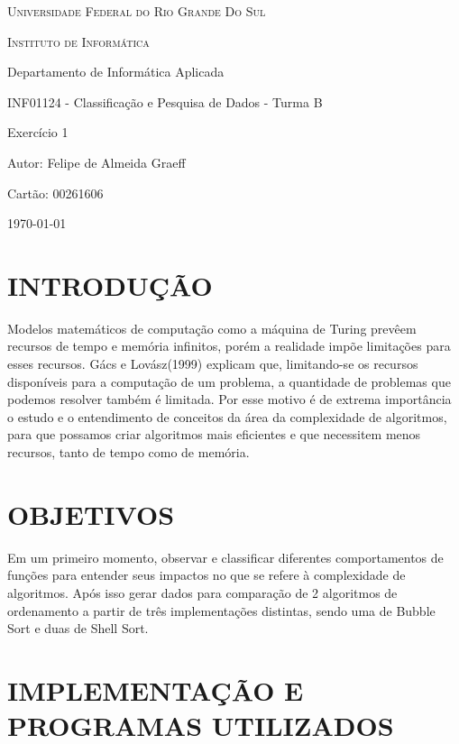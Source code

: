 \documentclass[titlepage,12pt,a4paper]{article}
\begin{document}
  \begin{titlepage}
    \centering
      {\scshape\LARGE Universidade Federal do Rio Grande Do Sul \par}
      {\scshape\Large Instituto de Informática \par}
      {\large Departamento de Informática Aplicada \par}
      {\large INF01124 - Classificação e Pesquisa de Dados - Turma B \par}
      \vfill
      {\LARGE Exercício 1 \par}
      \vfill
      {\raggedright\large Autor: Felipe de Almeida Graeff \par}
      {\raggedright\large Cartão: 00261606 \par}
      \vspace{5cm}
      \today
  \end{titlepage}

  \section{INTRODUÇÃO}

    Modelos matemáticos de computação como a máquina de Turing prevêem recursos
    de tempo e memória infinitos, porém a realidade impõe limitações para esses
    recursos. Gács e Lovász(1999)\cite{gacslovasz99} explicam que, limitando-se
    os recursos disponíveis para a computação de um problema, a quantidade de
    problemas que podemos resolver também é limitada. Por esse motivo é
    de extrema importância o estudo e o entendimento de conceitos da área da
    complexidade de algoritmos, para que possamos criar algoritmos mais
    eficientes e que necessitem menos recursos, tanto de tempo como de memória.

  \section{OBJETIVOS}

    Em um primeiro momento, observar e classificar diferentes comportamentos de
    funções para entender seus impactos no que se refere à complexidade de
    algoritmos. Após isso gerar dados para comparação de 2 algoritmos de ordenamento
    a partir de três implementações distintas, sendo uma de Bubble Sort e duas
    de Shell Sort.

  \section{IMPLEMENTAÇÃO E PROGRAMAS UTILIZADOS}
\end{document}
